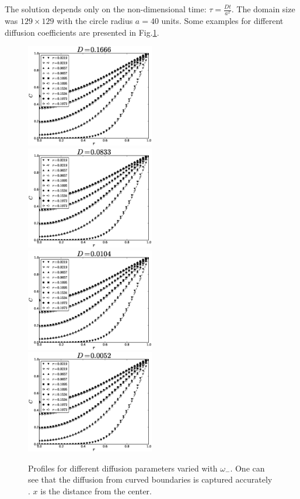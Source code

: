 \documentclass{article}
\newcommand{\omegaminus}{\omega_{-}}
\begin{document}
The solution depends only on the non-dimensional time: $\tau=\frac{D t}{a^2}$. The domain size was $129\times 129$ with the circle radius $a=40$ units. Some examples for
different diffusion coefficients are presented in Fig.\ref{fig:cylinder:benchmark}.
\begin{figure}[htb!]
\includegraphics[width=0.5\textwidth]{Figures/cylinder1666.eps}
\includegraphics[width=0.5\textwidth]{Figures/cylinder0833.eps}\\
\includegraphics[width=0.5\textwidth]{Figures/cylinder0104.eps}
\includegraphics[width=0.5\textwidth]{Figures/cylinder0052.eps}\\
\caption{Profiles for different diffusion parameters varied with $\omegaminus$. One can see that the
diffusion from curved boundaries is captured
accurately \label{fig:cylinder:benchmark}. $x$ is the distance from the center.}
\end{figure}
\end{document}
